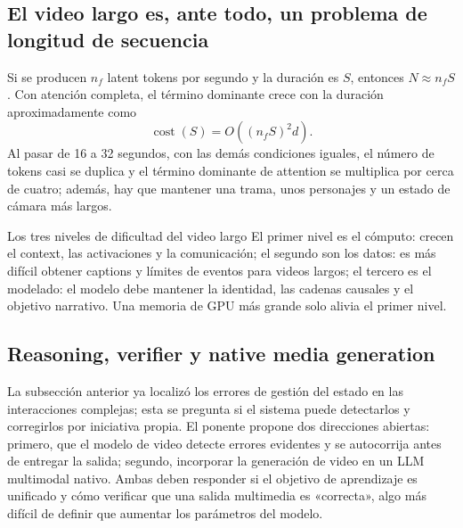 \subsection{El video largo es, ante todo, un problema de longitud de secuencia}

Si se producen $n_f$ latent tokens por segundo y la duración es $S$, entonces $N\approx n_fS$. Con atención completa, el término dominante crece con la duración aproximadamente como
\[
\operatorname{cost}(S)=O((n_fS)^2d).
\]
Al pasar de 16 a 32 segundos, con las demás condiciones iguales, el número de tokens casi se duplica y el término dominante de attention se multiplica por cerca de cuatro; además, hay que mantener una trama, unos personajes y un estado de cámara más largos.

\begin{knowledgebox}{Los tres niveles de dificultad del video largo}
El primer nivel es el cómputo: crecen el context, las activaciones y la comunicación; el segundo son los datos: es más difícil obtener captions y límites de eventos para videos largos; el tercero es el modelado: el modelo debe mantener la identidad, las cadenas causales y el objetivo narrativo. Una memoria de GPU más grande solo alivia el primer nivel.
\end{knowledgebox}


\subsection{Reasoning, verifier y native media generation}

La subsección anterior ya localizó los errores de gestión del estado en las interacciones complejas; esta se pregunta si el sistema puede detectarlos y corregirlos por iniciativa propia. El ponente propone dos direcciones abiertas: primero, que el modelo de video detecte errores evidentes y se autocorrija antes de entregar la salida; segundo, incorporar la generación de video en un LLM multimodal nativo. Ambas deben responder si el objetivo de aprendizaje es unificado y cómo verificar que una salida multimedia es «correcta», algo más difícil de definir que aumentar los parámetros del modelo.

